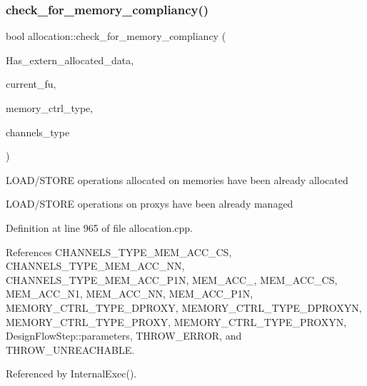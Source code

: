 \subsubsection{\texorpdfstring{check\+\_\+for\+\_\+memory\+\_\+compliancy()}{check\_for\_memory\_compliancy()}}
{\footnotesize\ttfamily bool allocation\+::check\+\_\+for\+\_\+memory\+\_\+compliancy (\begin{DoxyParamCaption}\item[{bool}]{Has\+\_\+extern\+\_\+allocated\+\_\+data,  }\item[{\hyperlink{technology__node_8hpp_a33dd193b7bd6b987bf0d8a770a819fa7}{technology\+\_\+node\+Ref}}]{current\+\_\+fu,  }\item[{const std\+::string \&}]{memory\+\_\+ctrl\+\_\+type,  }\item[{std\+::string}]{channels\+\_\+type }\end{DoxyParamCaption})\hspace{0.3cm}{\ttfamily [protected]}}

L\+O\+A\+D/\+S\+T\+O\+RE operations allocated on memories have been already allocated

L\+O\+A\+D/\+S\+T\+O\+RE operations on proxys have been already managed 

Definition at line 965 of file allocation.\+cpp.



References C\+H\+A\+N\+N\+E\+L\+S\+\_\+\+T\+Y\+P\+E\+\_\+\+M\+E\+M\+\_\+\+A\+C\+C\+\_\+\+CS, C\+H\+A\+N\+N\+E\+L\+S\+\_\+\+T\+Y\+P\+E\+\_\+\+M\+E\+M\+\_\+\+A\+C\+C\+\_\+\+NN, C\+H\+A\+N\+N\+E\+L\+S\+\_\+\+T\+Y\+P\+E\+\_\+\+M\+E\+M\+\_\+\+A\+C\+C\+\_\+\+P1N, M\+E\+M\+\_\+\+A\+C\+C\+\_, M\+E\+M\+\_\+\+A\+C\+C\+\_\+\+CS, M\+E\+M\+\_\+\+A\+C\+C\+\_\+\+N1, M\+E\+M\+\_\+\+A\+C\+C\+\_\+\+NN, M\+E\+M\+\_\+\+A\+C\+C\+\_\+\+P1N, M\+E\+M\+O\+R\+Y\+\_\+\+C\+T\+R\+L\+\_\+\+T\+Y\+P\+E\+\_\+\+D\+P\+R\+O\+XY, M\+E\+M\+O\+R\+Y\+\_\+\+C\+T\+R\+L\+\_\+\+T\+Y\+P\+E\+\_\+\+D\+P\+R\+O\+X\+YN, M\+E\+M\+O\+R\+Y\+\_\+\+C\+T\+R\+L\+\_\+\+T\+Y\+P\+E\+\_\+\+P\+R\+O\+XY, M\+E\+M\+O\+R\+Y\+\_\+\+C\+T\+R\+L\+\_\+\+T\+Y\+P\+E\+\_\+\+P\+R\+O\+X\+YN, Design\+Flow\+Step\+::parameters, T\+H\+R\+O\+W\+\_\+\+E\+R\+R\+OR, and T\+H\+R\+O\+W\+\_\+\+U\+N\+R\+E\+A\+C\+H\+A\+B\+LE.



Referenced by Internal\+Exec().

